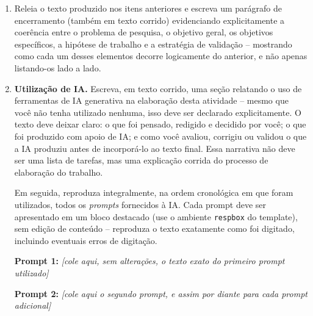\documentclass[10pt,a4paper]{extarticle}
\begin{document}
\begin{enumerate}[label=\textbf{\arabic*.}]
\item Releia o texto produzido nos itens anteriores e escreva um parágrafo de encerramento (também em texto corrido) evidenciando explicitamente a coerência entre o problema de pesquisa, o objetivo geral, os objetivos específicos, a hipótese de trabalho e a estratégia de validação -- mostrando como cada um desses elementos decorre logicamente do anterior, e não apenas listando-os lado a lado.

\item \textbf{Utilização de IA.} Escreva, em texto corrido, uma seção relatando o uso de ferramentas de IA generativa na elaboração desta atividade -- mesmo que você não tenha utilizado nenhuma, isso deve ser declarado explicitamente. O texto deve deixar claro: o que foi pensado, redigido e decidido por você; o que foi produzido com apoio de IA; e como você avaliou, corrigiu ou validou o que a IA produziu antes de incorporá-lo ao texto final. Essa narrativa não deve ser uma lista de tarefas, mas uma explicação corrida do processo de elaboração do trabalho.

Em seguida, reproduza integralmente, na ordem cronológica em que foram utilizados, todos os \emph{prompts} fornecidos à IA. Cada prompt deve ser apresentado em um bloco destacado (use o ambiente \texttt{respbox} do template), sem edição de conteúdo -- reproduza o texto exatamente como foi digitado, incluindo eventuais erros de digitação.

\begin{respbox}
\textbf{Prompt 1:} \textit{[cole aqui, sem alterações, o texto exato do primeiro prompt utilizado]}
\end{respbox}

\begin{respbox}
\textbf{Prompt 2:} \textit{[cole aqui o segundo prompt, e assim por diante para cada prompt adicional]}
\end{respbox}

\end{enumerate}
\end{document}
